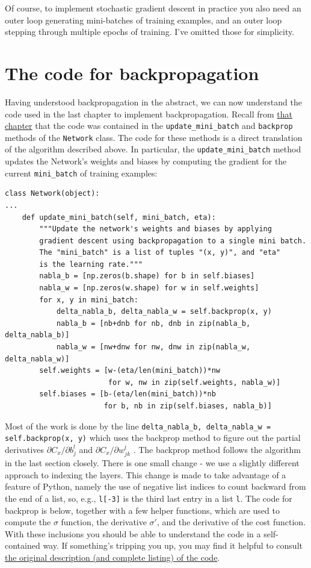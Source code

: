 Of course, to implement stochastic gradient descent in practice you also need an outer loop generating mini-batches of training examples, and an outer loop stepping through multiple epochs of training. I've omitted those for simplicity.

\section{The code for backpropagation}
\label{sec: The code for backpropagation}

Having understood backpropagation in the abstract, we can now understand the code used in the last chapter to implement backpropagation. Recall from \hyperref[sec: Implementing our network to classify digits]{that chapter} that the code was contained in the \texttt{update\_mini\_batch} and \texttt{backprop} methods of the \texttt{Network} class. The code for these methods is a direct translation of the algorithm described above. In particular, the \texttt{update\_mini\_batch} method updates the Network's weights and biases by computing the gradient for the current \texttt{mini\_batch} of training examples:

\begin{lstlisting}
class Network(object):
...
    def update_mini_batch(self, mini_batch, eta):
        """Update the network's weights and biases by applying
        gradient descent using backpropagation to a single mini batch.
        The "mini_batch" is a list of tuples "(x, y)", and "eta"
        is the learning rate."""
        nabla_b = [np.zeros(b.shape) for b in self.biases]
        nabla_w = [np.zeros(w.shape) for w in self.weights]
        for x, y in mini_batch:
            delta_nabla_b, delta_nabla_w = self.backprop(x, y)
            nabla_b = [nb+dnb for nb, dnb in zip(nabla_b, delta_nabla_b)]
            nabla_w = [nw+dnw for nw, dnw in zip(nabla_w, delta_nabla_w)]
        self.weights = [w-(eta/len(mini_batch))*nw 
                        for w, nw in zip(self.weights, nabla_w)]
        self.biases = [b-(eta/len(mini_batch))*nb 
                       for b, nb in zip(self.biases, nabla_b)]
\end{lstlisting}

Most of the work is done by the line \texttt{delta\_nabla\_b, delta\_nabla\_w = self.backprop(x, y)} which uses the backprop method to figure out the partial derivatives $\partial C_x/\partial b^l_j$ and $\partial C_x/\partial w^l_{jk}$
. The backprop method follows the algorithm in the last section closely. There is one small change - we use a slightly different approach to indexing the layers. This change is made to take advantage of a feature of Python, namely the use of negative list indices to count backward from the end of a list, so, e.g., \texttt{l[-3]} is the third last entry in a list \texttt{l}. The code for backprop is below, together with a few helper functions, which are used to compute the $\sigma$ function, the derivative $\sigma'$, and the derivative of the cost function. With these inclusions you should be able to understand the code in a self-contained way. If something's tripping you up, you may find it helpful to consult \hyperref[sec: Implementing our network to classify digits]{the original description (and complete listing) of the code}.

